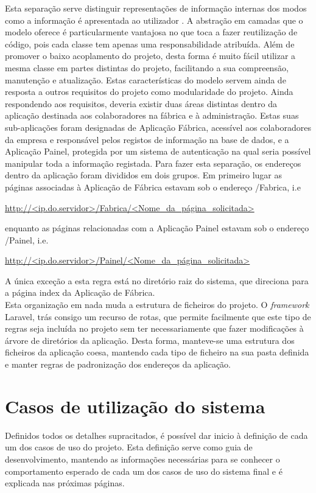 \noindent
Esta separação serve distinguir representações de informação internas dos modos como a informação é apresentada ao utilizador \cite{Wikipediad}.
A abstração em camadas que o modelo oferece é particularmente vantajosa no que toca a fazer reutilização de código, pois cada classe tem apenas uma responsabilidade atribuída. Além de promover o baixo acoplamento do projeto, desta forma é muito fácil utilizar a mesma classe em partes distintas do projeto, facilitando a sua compreensão, manutenção e atualização.
Estas características do modelo servem ainda de resposta a outros requisitos do projeto como modularidade do projeto.
Ainda respondendo aos requisitos, deveria existir duas áreas distintas dentro da aplicação destinada aos colaboradores na fábrica e à administração.
Estas suas sub-aplicações foram designadas de Aplicação Fábrica, acessível aos colaboradores da empresa e responsável pelos registos de informação na base de dados, e a Aplicação Painel, protegida por um sistema de autenticação na qual seria possível manipular toda a informação registada.
Para fazer esta separação, os endereços dentro da aplicação foram divididos em dois grupos. Em primeiro lugar as páginas associadas à Aplicação de Fábrica estavam sob o endereço /Fabrica, i.e

\begin{center}
\url{http://<ip.do.servidor>/Fabrica/<Nome_da_página_solicitada>}
\end{center}

\noindent 
enquanto as páginas relacionadas com a Aplicação Painel estavam sob o endereço /Painel, i.e.

\begin{center}
	\url{http://<ip.do.servidor>/Painel/<Nome_da_página_solicitada>}
\end{center}

\noindent 
A única exceção a esta regra está no diretório raiz do sistema, que direciona para a página index da Aplicação de Fábrica.\\
Esta organização em nada muda a estrutura de ficheiros do projeto. O \textit{framework} Laravel, trás consigo um recurso de rotas, que permite facilmente que este tipo de regras seja incluída no projeto sem ter necessariamente que fazer modificações à árvore de diretórios da aplicação. Desta forma, manteve-se uma estrutura dos ficheiros da aplicação coesa, mantendo cada tipo de ficheiro na sua pasta definida e manter regras de padronização dos endereços da aplicação.

\section{Casos de utilização do sistema}
Definidos todos os detalhes supracitados, é possível dar inicio à definição de cada um dos casos de uso do projeto. Esta definição serve como guia de desenvolvimento, mantendo as informações necessárias para se conhecer o comportamento esperado de cada um dos casos de uso do sistema final e é explicada nas próximas páginas.
\newpage

